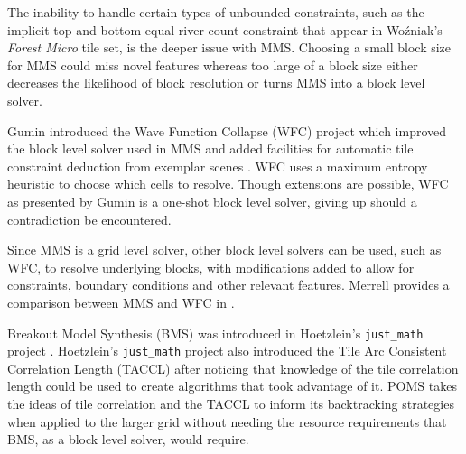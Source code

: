 The inability to handle certain types of unbounded constraints, such as the implicit top and bottom equal river count constraint that appear in
Wo\'zniak's \textit{Forest Micro} tile set, is the deeper issue with MMS.
Choosing a small block size for MMS could miss novel features whereas too large of a block size either decreases
the likelihood of block resolution or turns MMS into a block level solver.


Gumin introduced the Wave Function Collapse (WFC) project which improved the block level solver used in MMS
and added facilities for automatic tile constraint deduction from exemplar scenes \cite{Gumin_2016}.
WFC uses a maximum entropy heuristic to choose which cells to resolve.
Though extensions are possible, WFC as presented by Gumin is a one-shot block level solver, giving up should a contradiction be encountered.

Since MMS is a grid level solver, other block level solvers can be used, such as WFC, to resolve underlying blocks,
with modifications added to allow for constraints, boundary conditions and other relevant features.
Merrell provides a comparison between MMS and WFC in \cite{Merrell_comparison_2021}.

Breakout Model Synthesis (BMS) was introduced in Hoetzlein's \texttt{just\_math} project \cite{Hoetzlein_2023}.
Hoetzlein's \texttt{just\_math} project also introduced
the Tile Arc Consistent Correlation Length (TACCL) after noticing that knowledge of the tile correlation length could be
used to create algorithms that took advantage of it.
POMS takes the ideas of tile correlation and the TACCL to inform its backtracking strategies when applied to the larger grid
without needing the resource requirements that BMS, as a block level solver, would require.

